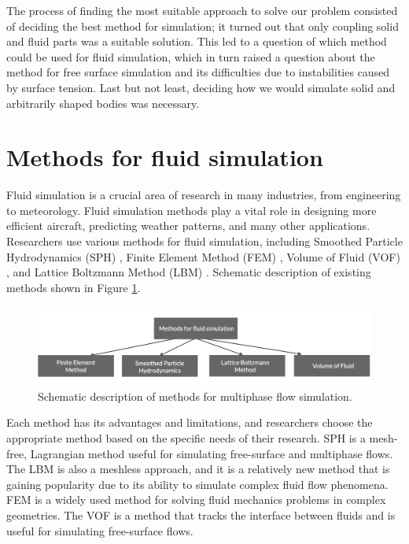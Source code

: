 The process of finding the most suitable approach to solve our problem consisted of deciding the best method for simulation; it turned out that only coupling solid and fluid parts was a suitable solution. This led to a question of which method could be used for fluid simulation, which in turn raised a question about the method for free surface simulation and its difficulties due to instabilities caused by surface tension. Last but not least, deciding how we would simulate solid and arbitrarily shaped bodies was necessary.

\section{Methods for fluid simulation}

Fluid simulation is a crucial area of research in many industries, from engineering to meteorology. Fluid simulation methods play a vital role in designing more efficient aircraft, predicting weather patterns, and many other applications. Researchers use various methods for fluid simulation, including Smoothed Particle Hydrodynamics (\ac{SPH}) \cite{gingold1977SPH, monaghan1994SPH}, Finite Element Method (\ac{FEM}) \cite{lewis2004fundamentals}, Volume of Fluid (\ac{VOF}) \cite{hirt1981volume}, and Lattice Boltzmann Method (\ac{LBM}) \cite{chen1998lattice}. Schematic description of existing methods shown in Figure \ref{fig:methods_for_fluids}.
\begin{figure}[!ht]
    \centering
    \includegraphics[width=15cm]{GWU_Thesis_Sarmakeeva/Images/chap1/methods_for_fluids.png}
    \caption{Schematic description of methods for multiphase flow simulation.}
    \label{fig:methods_for_fluids}
\end{figure}
Each method has its advantages and limitations, and researchers choose the appropriate method based on the specific needs of their research. SPH is a mesh-free, Lagrangian method useful for simulating free-surface and multiphase flows. The LBM is also a meshless approach, and it is a relatively new method that is gaining popularity due to its ability to simulate complex fluid flow phenomena. FEM is a widely used method for solving fluid mechanics problems in complex geometries. The VOF is a method that tracks the interface between fluids and is useful for simulating free-surface flows.

